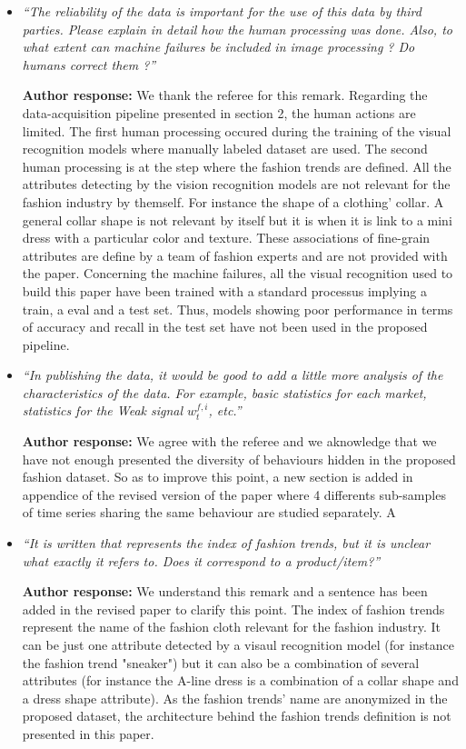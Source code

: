 \documentclass[10pt]{article} %
\begin{document}
\begin{itemize}
	\item {\em ``The reliability of the data is important for the use of this data by third parties. Please explain in detail how the human processing was done. Also, to what extent can machine failures be included in image processing ? Do humans correct them ?''} \medskip
	
	\textbf{Author response:} We thank the referee for this remark. Regarding the data-acquisition pipeline presented in section 2, the human actions are limited. The first human processing occured during the training of the visual recognition models where manually labeled dataset are used. The second human processing is at the step where the fashion trends are defined. All the attributes detecting by the vision recognition models are not relevant for the fashion industry by themself. For instance the shape of a clothing' collar. A general collar shape is not relevant by itself but it is when it is link to a mini dress with a particular color and texture. These associations of fine-grain attributes are define by a team of fashion experts and are not provided with the paper. Concerning the machine failures, all the visual recognition used to build this paper have been trained with a standard processus implying a train, a eval and a test set. Thus, models showing poor performance in terms of accuracy and recall in the test set have not been used in the proposed pipeline. \\
	
	\item {\em ``In publishing the data, it would be good to add a little more analysis of the characteristics of the data. For example, basic statistics for each market, statistics for the Weak signal $w^{f,i}_t$, etc.''} \medskip
	
	\textbf{Author response:} We agree with the referee and we aknowledge that we have not enough presented the diversity of behaviours hidden in the proposed fashion dataset. So as to improve this point, a new section is added in appendice of the revised version of the paper where 4 differents sub-samples of time series sharing the same behaviour are studied separately. A \\
	
	\item {\em ``It is written that represents the index of fashion trends, but it is unclear what exactly it refers to. Does it correspond to a product/item?''} \medskip

	\textbf{Author response:} We understand this remark and a sentence has been added in the revised paper to clarify this point. The index of fashion trends represent the name of the fashion cloth relevant for the fashion industry. It can be just one attribute detected by a visaul recognition model (for instance the fashion trend "sneaker") but it can also be a combination of several attributes (for instance the A-line dress is a combination of a collar shape and a dress shape attribute). As the fashion trends' name are anonymized in the proposed dataset, the architecture behind the fashion trends definition is not presented in this paper. \\
	

\end{itemize}
\end{document}

